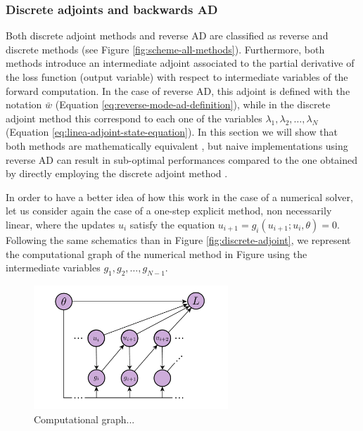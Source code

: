 \subsubsection{Discrete adjoints and backwards AD}
\label{section:comparison-discrete-adjoint-AD}

Both discrete adjoint methods and reverse AD are classified as reverse and discrete methods (see Figure \ref{fig:scheme-all-methods}). 
Furthermore, both methods introduce an intermediate adjoint associated to the partial derivative of the loss function (output variable) with respect to intermediate variables of the forward computation.
In the case of reverse AD, this adjoint is defined with the notation $\bar w$ (Equation \eqref{eq:reverse-mode-ad-definition}), while in the discrete adjoint method this correspond to each one of the variables $\lambda_1, \lambda_2, \ldots, \lambda_N$ (Equation \eqref{eq:linea-adjoint-state-equation}).
In this section we will show that both methods are mathematically equivalent \cite{Zhu_Xu_Darve_Beroza_2021, li2020coupled}, but naive implementations using reverse AD can result in sub-optimal performances compared to the one obtained by directly employing the discrete adjoint method \cite{Alexe_Sandu_2009}. 

In order to have a better idea of how this work in the case of a numerical solver, let us consider again the case of a one-step explicit method, non necessarily linear, where the updates $u_{i}$ satisfy the equation $u_{i+1} = g_{i}(u_{i+1} ; u_{i}, \theta) = 0$.
Following the same schematics than in Figure \ref{fig:discrete-adjoint}, we represent the computational graph of the numerical method in Figure  using the intermediate variables $g_1, g_2, \ldots, g_{N-1}$.

\begin{figure}[t]
    \centering
    \includegraphics[width=0.65\textwidth]{tex/figures/AD-discrete-adjoint.pdf}
    \caption{Computational graph... }
    \label{fig:ad-vs-discrete-adjoint}
\end{figure}

